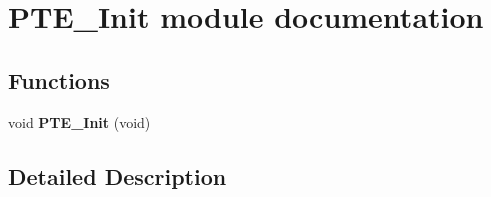 \hypertarget{group___p_t_e___init__module}{}\section{P\+T\+E\+\_\+\+Init module documentation}
\label{group___p_t_e___init__module}
\subsection*{Functions}
\begin{DoxyCompactItemize}
\item 
void {\bfseries P\+T\+E\+\_\+\+Init} (void)\hypertarget{group___p_t_e___init__module_ga9550c08b74d3d6411772b66108fa619c}{}\label{group___p_t_e___init__module_ga9550c08b74d3d6411772b66108fa619c}

\end{DoxyCompactItemize}


\subsection{Detailed Description}
